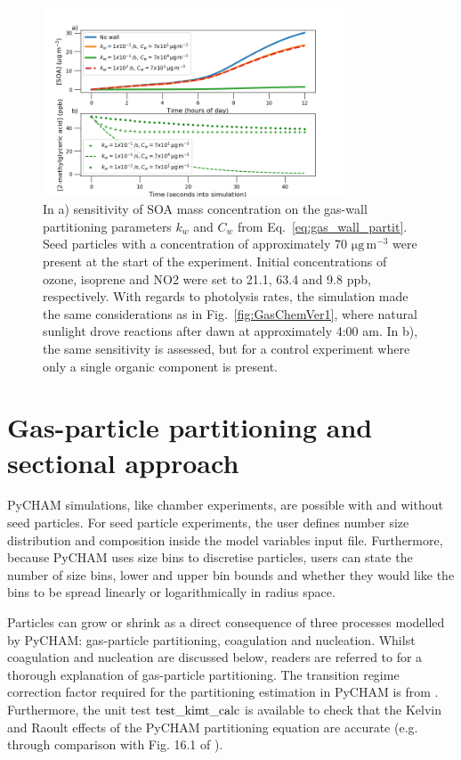 \documentclass[gmd, manuscript]{copernicus}
\begin{document}
\begin{figure}[t]
\includegraphics[width=9.0cm]{Results/Gaswall_sens_fig.png}
\caption{In a) sensitivity of SOA mass concentration on the gas-wall partitioning parameters $k_{w}$ and $C_{w}$ from Eq.~\ref{eq:gas_wall_partit}.  Seed particles with a concentration of approximately 70 $\mathrm{\mu g\, m^{-3}}$ were present at the start of the experiment.  Initial concentrations of ozone, isoprene and NO2 were set to 21.1, 63.4 and 9.8 ppb, respectively.  With regards to photolysis rates, the simulation made the same considerations as in Fig.~\ref{fig:GasChemVer1}, where natural sunlight drove reactions after dawn at approximately 4:00 am.  In b), the same sensitivity is assessed, but for a control experiment where only a single organic component is present.}
\label{fig:Gaswall_sens_fig}
\end{figure}

\section{Gas-particle partitioning and sectional approach}\label{sec:gp_part}

PyCHAM simulations, like chamber experiments, are possible with and without seed particles.  For seed particle experiments, the user defines number size distribution and composition inside the model variables input file.  Furthermore, because PyCHAM uses size bins to discretise particles, users can state the number of size bins, lower and upper bin bounds and whether they would like the bins to be spread linearly or logarithmically in radius space.  

Particles can grow or shrink as a direct consequence of three processes modelled by PyCHAM: gas-particle partitioning, coagulation and nucleation.  Whilst coagulation and nucleation are discussed below, readers are referred to \citet{Zaveri2008} for a thorough explanation of gas-particle partitioning.  The transition regime correction factor required for the partitioning estimation in PyCHAM is from \citet{Fuchs1971}.  Furthermore, the unit test $\rm{test\_kimt\_calc}$ is available to check that the Kelvin and Raoult effects of the PyCHAM partitioning equation are accurate (e.g. through comparison with Fig. 16.1 of \citet{Jacobson2005}).
\end{document}
